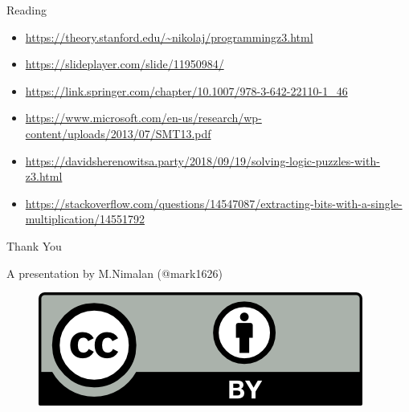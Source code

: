 \documentclass{beamer}
\begin{document}
\begin{frame}{Reading}
  \tiny
  \begin{itemize}
    \item \url{https://theory.stanford.edu/~nikolaj/programmingz3.html}
    \item \url{https://slideplayer.com/slide/11950984/}
    \item \url{https://link.springer.com/chapter/10.1007/978-3-642-22110-1_46}
    \item \url{https://www.microsoft.com/en-us/research/wp-content/uploads/2013/07/SMT13.pdf}
    \item \url{https://davidsherenowitsa.party/2018/09/19/solving-logic-puzzles-with-z3.html}
    \item \url{https://stackoverflow.com/questions/14547087/extracting-bits-with-a-single-multiplication/14551792}
  \end{itemize}
\end{frame}

\begin{frame}{Thank You}
  \begin{center}
    A presentation by M.Nimalan (@mark1626)
    \begin{figure}[h]
      \includegraphics{cc_by}
    \end{figure}
  \end{center}
\end{frame}
\end{document}
